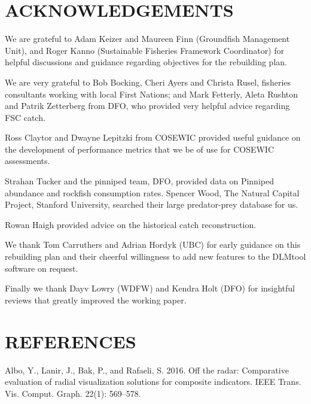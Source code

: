 \documentclass[11pt]{book}
\begin{document}
\clearpage

\hypertarget{acknowledgements}{%
\section{ACKNOWLEDGEMENTS}\label{acknowledgements}}

We are grateful to Adam Keizer and Maureen Finn (Groundfish Management Unit), and Roger Kanno (Sustainable Fisheries Framework Coordinator) for helpful discussions and guidance regarding objectives for the rebuilding plan.

We are very grateful to Bob Bocking, Cheri Ayers and Christa Rusel, fisheries consultants working with local First Nations; and Mark Fetterly, Aleta Rushton and Patrik Zetterberg from DFO, who provided very helpful advice regarding FSC catch.

Ross Claytor and Dwayne Lepitzki from COSEWIC provided useful guidance on the development of performance metrics that we be of use for COSEWIC assessments.

Strahan Tucker and the pinniped team, DFO, provided data on Pinniped abundance and rockfish consumption rates. Spencer Wood, The Natural Capital Project, Stanford University, searched their large predator-prey database for us.

Rowan Haigh provided advice on the historical catch reconstruction.

We thank Tom Carruthers and Adrian Hordyk (UBC) for early guidance on this rebuilding plan and their cheerful willingness to add new features to the DLMtool software on request.

Finally we thank Dayv Lowry (WDFW) and Kendra Holt (DFO) for insightful reviews that greatly improved the working paper.

\clearpage

\hypertarget{references}{%
\section*{REFERENCES}\label{references}}
{}
\noindent
\vspace{-2em}
\setlength{\parindent}{-0.2in}
\setlength{\leftskip}{0.2in}
\setlength{\parskip}{8pt}

\hypertarget{refs}{}
\leavevmode\hypertarget{ref-albo2016}{}%
Albo, Y., Lanir, J., Bak, P., and Rafaeli, S. 2016. Off the radar: Comparative evaluation of radial visualization solutions for composite indicators. IEEE Trans. Vis. Comput. Graph. 22(1): 569--578.
\end{document}
